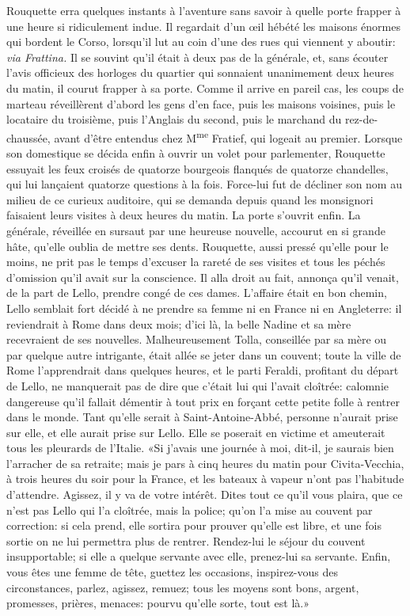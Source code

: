 Rouquette erra quelques instants à l'aventure sans savoir à quelle porte frapper à une heure si ridiculement indue. Il regardait d'un \oe{}il hébété les maisons énormes qui bordent le Corso, lorsqu'il lut au coin d'une des rues qui viennent y aboutir: \emph{via Frattina.} Il se souvint qu'il était à deux pas de la générale, et, sans écouter l'avis officieux des horloges du quartier qui sonnaient unanimement deux heures du matin, il courut frapper à sa porte. Comme il arrive en pareil cas, les coups de marteau réveillèrent d'abord les gens d'en face, puis les maisons voisines, puis le locataire du troisième, puis l'Anglais du second, puis le marchand du rez-de-chaussée, avant d'être entendus chez M\textsuperscript{me} Fratief, qui logeait au premier. Lorsque son domestique se décida enfin à ouvrir un volet pour parlementer, Rouquette essuyait les feux croisés de quatorze bourgeois flanqués de quatorze chandelles, qui lui lançaient quatorze questions à la fois. Force-lui fut de décliner son nom au milieu de ce curieux auditoire, qui se demanda depuis quand les monsignori faisaient leurs visites à deux heures du matin. La porte s'ouvrit enfin. La générale, réveillée en sursaut par une heureuse nouvelle, accourut en si grande hâte, qu'elle oublia de mettre ses dents. Rouquette, aussi pressé qu'elle pour le moins, ne prit pas le temps d'excuser la rareté de ses visites et tous les péchés d'omission qu'il avait sur la conscience. Il alla droit au fait, annonça qu'il venait, de la part de Lello, prendre congé de ces dames. L'affaire était en bon chemin, Lello semblait fort décidé à ne prendre sa femme ni en France ni en Angleterre: il reviendrait à Rome dans deux mois; d'ici là, la belle Nadine et sa mère recevraient de ses nouvelles. Malheureusement Tolla, conseillée par sa mère ou par quelque autre intrigante, était allée se jeter dans un couvent; toute la ville de Rome l'apprendrait dans quelques heures, et le parti Feraldi, profitant du départ de Lello, ne manquerait pas de dire que c'était lui qui l'avait cloîtrée: calomnie dangereuse qu'il fallait démentir à tout prix en forçant cette petite folle à rentrer dans le monde. Tant qu'elle serait à Saint-Antoine-Abbé, personne n'aurait prise sur elle, et elle aurait prise sur Lello. Elle se poserait en victime et ameuterait tous les pleurards de l'Italie. «Si j'avais une journée à moi, dit-il, je saurais bien l'arracher de sa retraite; mais je pars à cinq heures du matin pour Civita-Vecchia, à trois heures du soir pour la France, et les bateaux à vapeur n'ont pas l'habitude d'attendre. Agissez, il y va de votre intérêt. Dites tout ce qu'il vous plaira, que ce n'est pas Lello qui l'a cloîtrée, mais la police; qu'on l'a mise au couvent par correction: si cela prend, elle sortira pour prouver qu'elle est libre, et une fois sortie on ne lui permettra plus de rentrer. Rendez-lui le séjour du couvent insupportable; si elle a quelque servante avec elle, prenez-lui sa servante. Enfin, vous êtes une femme de tête, guettez les occasions, inspirez-vous des circonstances, parlez, agissez, remuez; tous les moyens sont bons, argent, promesses, prières, menaces: pourvu qu'elle sorte, tout est là.»

